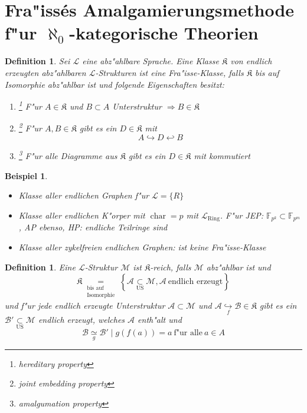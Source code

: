 \documentclass[a4paper,12pt,numbers=noenddot,parskip=full]{scrartcl}
\newcommand{\scrL}{\mathcal{L}}
\newcommand{\scrA}{\mathcal{A}}
\newcommand{\scrB}{\mathcal{B}}
\newcommand{\scrM}{\mathcal{M}}
\newcommand{\fK}{\mathfrak{K}}
\DeclareMathOperator{\charac}{char}
\DeclareMathOperator{\ring}{Ring}
\theoremstyle{dotless}
\newtheorem{definition}[theorem]{Definition}
\newtheorem{example}[theorem]{Beispiel}
\begin{document}
\section{Fra"issés Amalgamierungsmethode f"ur $\aleph_0$-kategorische Theorien}
\begin{definition}
	Sei $\scrL$ eine abz"ahlbare Sprache. Eine Klasse $\fK$ von endlich erzeugten abz"ahlbaren $\scrL$-Strukturen ist eine \emph{Fra"isse-Klasse}, falls $\fK$ bis auf Isomorphie abz"ahlbar ist und folgende Eigenschaften besitzt:
	\begin{enumerate}
		\item[HP]\label{HP}\footnote{hereditary property} F"ur $A \in \fK$ und $B \subset A$ Unterstruktur $\Rightarrow B \in \fK$
		\item[JEP]\label{JEP}\footnote{joint embedding property} F"ur $A, B \in \fK$ gibt es ein $D \in \fK$ mit \begin{equation*}
			A \hookrightarrow D \hookleftarrow B
		\end{equation*}
		\item[AP]\label{AP}\footnote{amalgumation property} F"ur alle Diagramme aus $\fK$ %
		gibt es ein $D \in \fK$ mit kommutiert
	\end{enumerate}
\end{definition}
\begin{example}
	\begin{itemize}
		\item Klasse aller endlichen Graphen f"ur $\scrL = \{R\}$
		\item Klasse aller endlichen K"orper mit $\charac = p$ mit $\scrL_{\ring}$. F"ur JEP: $\mathbb{F}_{p^k} \subset \mathbb{F}_{p^m}$, AP ebenso, HP: endliche Teilringe sind
		\item Klasse aller zykelfreien endlichen Graphen: ist keine Fra"isse-Klasse
	\end{itemize}
\end{example}
\begin{definition}\label{reich}
	Eine $\scrL$-Struktur $\scrM$ ist $\fK$-reich, falls $\scrM$ abz"ahlbar ist und 
	\begin{equation*}
		\fK \underset{\substack{\text{bis auf}\\\text{Isomorphie}}}{=} \left\{\scrA \underset{\text{US}}{\subset}\scrM, \scrA~ \text{endlich erzeugt} \right\}
	\end{equation*}
	und f"ur jede endlich erzeugte Unterstruktur $\scrA \subset \scrM$ und $\scrA \underset{f}{\hookrightarrow} \scrB \in \fK$ gibt es ein $\scrB' \underset{\text{US}}{\subset} \scrM$ endlich erzeugt, welches $\scrA$ enth"alt und
	\begin{equation*}
		\scrB \underset{g}{\simeq} \scrB' \mid g(f(a))=a~ \text{f"ur alle}~ a \in A
	\end{equation*}
\end{definition}
\end{document}

